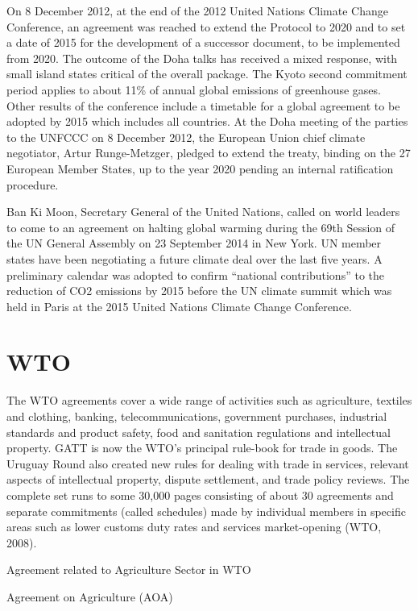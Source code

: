 \documentclass[]{book}
\begin{document}
On 8 December 2012, at the end of the 2012 United Nations Climate Change Conference, an agreement was reached to extend the Protocol to 2020 and to set a date of 2015 for the development of a successor document, to be implemented from 2020. The outcome of the Doha talks has received a mixed response, with small island states critical of the overall package. The Kyoto second commitment period applies to about 11\% of annual global emissions of greenhouse gases. Other results of the conference include a timetable for a global agreement to be adopted by 2015 which includes all countries. At the Doha meeting of the parties to the UNFCCC on 8 December 2012, the European Union chief climate negotiator, Artur Runge-Metzger, pledged to extend the treaty, binding on the 27 European Member States, up to the year 2020 pending an internal ratification procedure.

Ban Ki Moon, Secretary General of the United Nations, called on world leaders to come to an agreement on halting global warming during the 69th Session of the UN General Assembly on 23 September 2014 in New York. UN member states have been negotiating a future climate deal over the last five years. A preliminary calendar was adopted to confirm ``national contributions'' to the reduction of CO2 emissions by 2015 before the UN climate summit which was held in Paris at the 2015 United Nations Climate Change Conference.

\hypertarget{wto}{%
\section{WTO}\label{wto}}

The WTO agreements cover a wide range of activities such as agriculture, textiles and clothing, banking, telecommunications, government purchases, industrial standards and product safety, food and sanitation regulations and intellectual property. GATT is now the WTO's principal rule-book for trade in goods. The Uruguay Round also created new rules for dealing with trade in services, relevant aspects of intellectual property, dispute settlement, and trade policy reviews. The complete set runs to some 30,000 pages consisting of about 30 agreements and separate commitments (called schedules) made by individual members in specific areas such as lower customs duty rates and services market-opening (WTO, 2008).

Agreement related to Agriculture Sector in WTO

Agreement on Agriculture (AOA)
\end{document}
